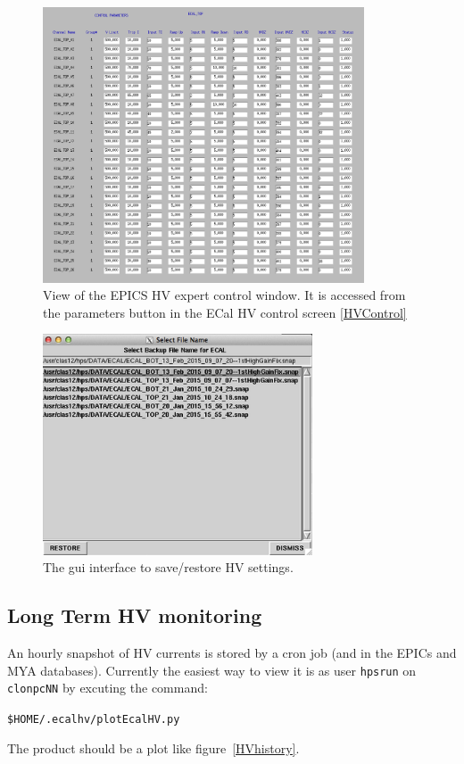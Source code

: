 \documentclass[12pt]{article}
\begin{document}
\begin{figure}[htbp]
\center
\includegraphics[width=0.85\textwidth]{pics/ecalhv_parameters_2014_12_15.png}
\caption{\small \label{EHV} View of the EPICS HV expert control window. It is accessed from the parameters button in the ECal HV control screen \ref{HVControl}}
\end{figure}

\begin{figure}[htbp]\centering
    \includegraphics[width=8cm]{pics/hvrestore.png}
    \caption{The gui interface to save/restore HV settings.  \label{fig:hvrestore}}
\end{figure}

   \subsection{Long Term HV monitoring}

   An hourly snapshot of HV currents is stored by a cron job (and in the EPICs and MYA databases).  Currently the easiest way to view it is as user \texttt{hpsrun} on \texttt{clonpcNN} by excuting the command:
   \begin{center}
   \texttt{\$HOME/.ecalhv/plotEcalHV.py}
   \end{center}
The product should be a plot like figure~\ref{HVhistory}.
\end{document}
